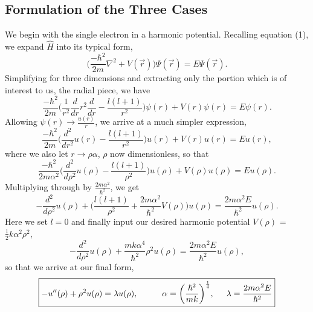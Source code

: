 \documentclass[11pt,a4paper]{article}
\begin{document}
\subsection{Formulation of the Three Cases}
We begin with the single electron in a harmonic potential. 
Recalling equation (1), we expand $\hat{H}$ into its typical form,
\begin{equation}
\bigg(\frac{-\hbar^2}{2m}\nabla^2 + V(\vec{r})\bigg)\Psi(\vec{r}) = E\Psi(\vec{r}).
\end{equation}
Simplifying for three dimensions and extracting only the portion which is of interest to us, the radial piece, we have
\begin{equation}
\frac{-\hbar^2}{2m}\bigg(\frac{1}{r^2}\frac{d}{dr}r^2\frac{d}{dr} - \frac{l(l+1)}{r^2}\bigg)\psi(r) + V(r)\psi(r) = E\psi(r).
\end{equation}
Allowing $\psi(r) \rightarrow \frac{u(r)}{r}$, we arrive at a much simpler expression,
\begin{equation}
\frac{-\hbar^2}{2m}\bigg(\frac{d^2}{dr^2}u(r) - \frac{l(l+1)}{r^2}\bigg)u(r) + V(r)u(r) = Eu(r), 
\end{equation}
where we also let $r \rightarrow \rho\alpha$, $\rho$ now dimensionless, so that
\begin{equation}
\frac{-\hbar^2}{2m\alpha^2}\bigg(\frac{d^2}{d\rho^2}u(\rho) - \frac{l(l+1)}{\rho^2}\bigg)u(\rho) + V(\rho)u(\rho) = Eu(\rho).
\end{equation}
Multiplying through by $\frac{2m\alpha^2}{\hbar^2}$, we get
\begin{equation}
-\frac{d^2}{d\rho^2}u(\rho) + \bigg(\frac{l(l+1)}{\rho^2} + \frac{2m\alpha^2}{\hbar^2}V(\rho)\bigg)u(\rho) = \frac{2m\alpha^2E}{\hbar^2}u(\rho).
\end{equation}
Here we set $l = 0$ and finally input our desired harmonic potential $V(\rho)$ = $\frac{1}{2}k\alpha^2\rho^2$,
\begin{equation}
-\frac{d^2}{d\rho^2}u(\rho) + \frac{mk\alpha^4}{\hbar^2}\rho^2u(\rho) = \frac{2m\alpha^2E}{\hbar^2}u(\rho),
\end{equation}
so that we arrive at our final form,
\begin{equation}
\boxed{-u''(\rho) + \rho^2u(\rho) = \lambda u(\rho), \hspace{1.0 cm} \alpha = \bigg(\frac{\hbar^2}{mk}\bigg)^{\frac{1}{4}}, \hspace{0.5 cm} \lambda = \frac{2m\alpha^2E}{\hbar^2}}
\end{equation}
\end{document}
